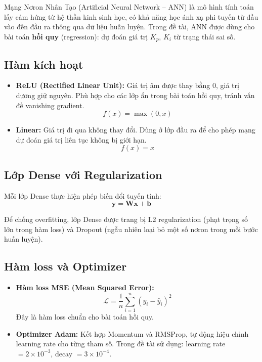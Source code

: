 Mạng Nơron Nhân Tạo (Artificial Neural Network -- ANN) là mô hình tính toán
lấy cảm hứng từ hệ thần kinh sinh học, có khả năng học ánh xạ phi tuyến từ
đầu vào đến đầu ra thông qua dữ liệu huấn luyện. Trong đề tài, ANN được dùng
cho bài toán \textbf{hồi quy} (regression): dự đoán giá trị $K_p$, $K_i$ từ
trạng thái sai số.

\subsection{Hàm kích hoạt}

\begin{itemize}
    \item \textbf{ReLU (Rectified Linear Unit):} Giá trị âm được thay bằng 0,
    giá trị dương giữ nguyên. Phù hợp cho các lớp ẩn trong bài toán hồi quy,
    tránh vấn đề vanishing gradient.
    \begin{equation}
        f(x) = \max(0, x)
    \end{equation}

    \item \textbf{Linear:} Giá trị đi qua không thay đổi. Dùng ở lớp đầu ra
    để cho phép mạng dự đoán giá trị liên tục không bị giới hạn.
    \begin{equation}
        f(x) = x
    \end{equation}
\end{itemize}

\subsection{Lớp Dense với Regularization}

Mỗi lớp Dense thực hiện phép biến đổi tuyến tính:
\begin{equation}
    \mathbf{y} = \mathbf{W}\mathbf{x} + \mathbf{b}
\end{equation}

Để chống overfitting, lớp Dense được trang bị L2 regularization
(phạt trọng số lớn trong hàm loss) và Dropout (ngẫu nhiên loại bỏ một số
nơron trong mỗi bước huấn luyện).

\subsection{Hàm loss và Optimizer}

\begin{itemize}
    \item \textbf{Hàm loss MSE (Mean Squared Error):}
    \begin{equation}
        \mathcal{L} = \frac{1}{n}\sum_{i=1}^{n}(y_i - \hat{y}_i)^2
    \end{equation}
    Đây là hàm loss chuẩn cho bài toán hồi quy.

    \item \textbf{Optimizer Adam:} Kết hợp Momentum và RMSProp, tự động hiệu
    chỉnh learning rate cho từng tham số. Trong đề tài sử dụng:
    learning rate $= 2 \times 10^{-3}$, decay $= 3 \times 10^{-4}$.
\end{itemize}



